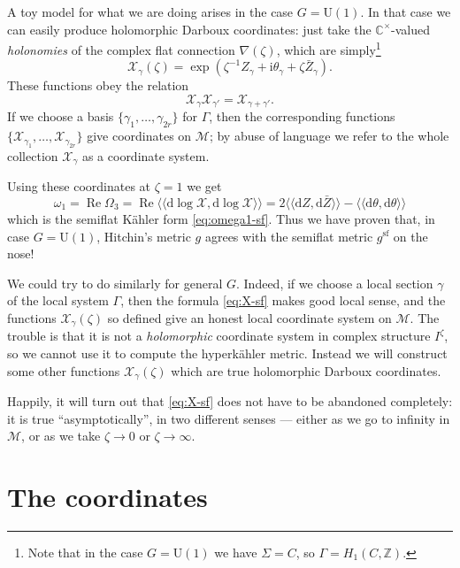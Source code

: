 \documentclass[12pt,letterpaper,reqno]{article}
\numberwithin{equation}{section}
\newcommand{\cM}{\ensuremath{\mathcal M}}
\newcommand{\cX}{\ensuremath{\mathcal X}}
\newcommand{\C}{\ensuremath{\mathbb C}}
\newcommand{\Z}{\ensuremath{\mathbb Z}}
\newcommand{\kahler}{K\"ahler\xspace}
\newcommand{\hk}{hyperk\"ahler\xspace}
\newcommand{\I}{{\mathrm i}}
\newcommand{\de}{\mathrm{d}}
\renewcommand{\sf}{\mathrm{sf}}
\newcommand{\DIP}[1]{\langle\!\langle#1\rangle\!\rangle}
\newcommand{\ti}[1]{\textit{#1}}
\DeclareMathOperator{\re}{Re}
\newcommand{\U}{\mathrm{U}}
\begin{document}
\begin{remark}[The case of $G = \U(1)$]
A toy model for what we are doing arises in the
case $G = \U(1)$. In that case we can easily produce holomorphic Darboux coordinates: 
just take the $\C^\times$-valued \ti{holonomies} of the 
complex flat connection $\nabla(\zeta)$, which are simply\footnote{Note that in the case
$G = \U(1)$ we have $\Sigma = C$, so $\Gamma = H_1(C,\Z)$.}
\begin{equation} \label{eq:X-sf}
  \cX_\gamma(\zeta) = \exp \left( \zeta^{-1} Z_\gamma + \I \theta_\gamma + \zeta \bar Z_\gamma \right).
\end{equation}
These functions obey the relation
\begin{equation}
	\cX_{\gamma} \cX_{\gamma'} = \cX_{\gamma + \gamma'}.
\end{equation}
If we choose a basis $\{\gamma_1, \dots, \gamma_{2r}\}$
for $\Gamma$, then the corresponding functions
$\{\cX_{\gamma_1}, \dots, \cX_{\gamma_{2r}}\}$
give coordinates on $\cM$; by abuse of
language we refer to the whole collection 
$\cX_\gamma$ as a coordinate system.

Using these coordinates at $\zeta = 1$ we get
\begin{equation}
 \omega_1 = \re \Omega_3 = \re \DIP{\de \log \cX, \de \log \cX} = 2 \DIP{\de Z, \de \bar{Z}} - \DIP{\de \theta, \de \theta}
\end{equation}
which is the semiflat \kahler form \eqref{eq:omega1-sf}.
Thus we have proven that, in case $G = \U(1)$, Hitchin's metric $g$ agrees
with the semiflat metric $g^\sf$ on the nose!
\end{remark}

We could try to do similarly for general $G$.
Indeed, if we choose a local section $\gamma$ of the local
system $\Gamma$, then 
the formula \eqref{eq:X-sf} makes good local sense,
and the functions $\cX_\gamma(\zeta)$ so defined 
give an honest local coordinate system
on $\cM$. The trouble is that it is not a \ti{holomorphic}
coordinate system in complex structure $I^\zeta$, so we 
cannot use it to compute the \hk metric.
Instead we will construct some
other functions $\cX_\gamma(\zeta)$ which are true 
holomorphic Darboux coordinates. 

Happily, it will turn out 
that \eqref{eq:X-sf} does not have to be abandoned completely:
it is true ``asymptotically'', in two different senses --- 
either as we go
to infinity in $\cM$, or as we take $\zeta \to 0$ or
$\zeta \to \infty$.


\section{The coordinates} \label{sec:coordinates}
\end{document}
